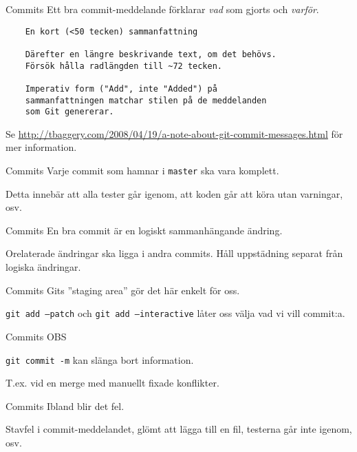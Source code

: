 \documentclass[11pt,xetex]{beamer}
\begin{document}
\begin{frame}[fragile]{Commits}
  \Large
  Ett bra commit-meddelande förklarar \emph{vad} som gjorts och \emph{varför}.

  \begin{verbatim}
    En kort (<50 tecken) sammanfattning

    Därefter en längre beskrivande text, om det behövs.
    Försök hålla radlängden till ~72 tecken.

    Imperativ form ("Add", inte "Added") på
    sammanfattningen matchar stilen på de meddelanden
    som Git genererar.
  \end{verbatim}

  \normalsize
  Se
  \url{http://tbaggery.com/2008/04/19/a-note-about-git-commit-messages.html}
  för mer information.
\end{frame}

\begin{frame}{Commits}
  \Large
  Varje commit som hamnar i \texttt{master} ska vara komplett.

  \normalsize
  Detta innebär att alla tester går igenom, att koden går att köra utan
  varningar, osv.
\end{frame}

\begin{frame}{Commits}
  \Large
  En bra commit är en logiskt sammanhängande ändring.

  \normalsize
  Orelaterade ändringar ska ligga i andra commits. Håll uppstädning separat
  från logiska ändringar.
\end{frame}

\begin{frame}{Commits}
  \Large
  Gits ''staging area'' gör det här enkelt för oss.
  \pause

  \texttt{git add --patch} och \texttt{git add
      --interactive} låter oss välja vad vi vill commit:a.
\end{frame}

\begin{frame}{Commits}
  \Huge
  \alert{OBS}

  \Large
  \texttt{git commit -m} kan slänga bort information.

  \normalsize
  T.ex. vid en merge med manuellt fixade konflikter.
\end{frame}

\begin{frame}{Commits}
  \Large
  Ibland blir det fel.
  \pause

  \normalsize
  Stavfel i commit-meddelandet, glömt att lägga till en fil, testerna går inte
  igenom, osv.
\end{frame}
\end{document}
